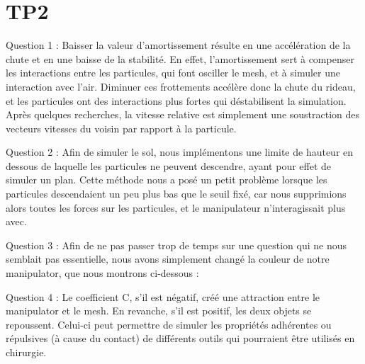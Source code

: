 \documentclass[a4paper,12pt]{article}
\begin{document}
\section{TP2}

Question 1 : Baisser la valeur d'amortissement résulte en une accélération de la chute et en une baisse de la stabilité. En effet, l'amortissement sert à compenser les interactions entre les particules, qui font osciller le mesh, et à simuler une interaction avec l'air. Diminuer ces \og{}frottements\fg{} accélère donc la chute du rideau, et les particules ont des interactions plus fortes qui déstabilisent la simulation. Après quelques recherches, la vitesse relative est simplement une soustraction des vecteurs vitesses du voisin par rapport à la particule.

Question 2 : Afin de simuler le sol, nous implémentons une limite de hauteur en dessous de laquelle les particules ne peuvent descendre, ayant pour effet de simuler un plan. Cette méthode nous a posé un petit problème lorsque les particules descendaient un peu plus bas que le seuil fixé, car nous supprimions alors toutes les forces sur les particules, et le manipulateur n’interagissait plus avec.


Question 3 : Afin de ne pas passer trop de temps sur une question qui ne nous semblait pas essentielle, nous avons simplement changé la couleur de notre manipulator, que nous montrons ci-dessous : %


Question 4 : Le coefficient C, s'il est négatif, créé une attraction entre le manipulator et le mesh. En revanche, s'il est positif, les deux objets se repoussent. Celui-ci peut permettre de simuler les propriétés adhérentes ou répulsives (à cause du contact) de différents outils qui pourraient être utilisés en chirurgie.
\end{document}
